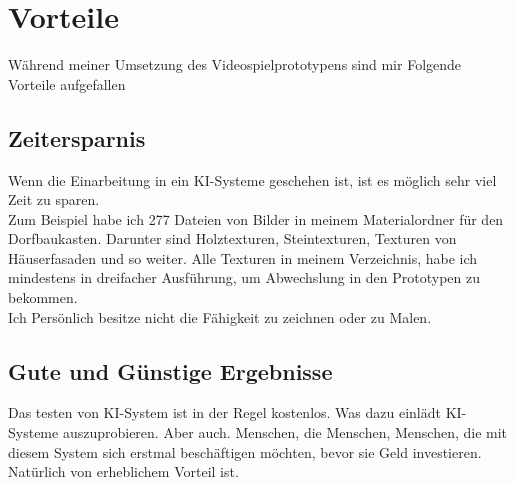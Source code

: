 \chapter{Vorteile}
Während meiner Umsetzung des Videospielprototypens sind mir Folgende Vorteile aufgefallen
\section{Zeitersparnis}
Wenn die Einarbeitung in ein KI-Systeme geschehen ist, ist es möglich sehr viel Zeit zu sparen.
\\
Zum Beispiel habe ich 277 Dateien von Bilder in meinem Materialordner für den Dorfbaukasten. Darunter sind Holztexturen, Steintexturen, Texturen von Häuserfasaden und so weiter. Alle Texturen in meinem Verzeichnis, habe ich mindestens in dreifacher Ausführung, um Abwechslung in den Prototypen zu bekommen.
\\
Ich Persönlich besitze nicht die Fähigkeit zu zeichnen oder zu Malen.
\section{Gute und Günstige Ergebnisse}
Das testen von KI-System ist in der Regel kostenlos. Was dazu einlädt KI-Systeme auszuprobieren.  Aber auch. Menschen, die Menschen, Menschen, die mit diesem System sich erstmal beschäftigen möchten, bevor sie Geld investieren. Natürlich von erheblichem Vorteil ist.  

